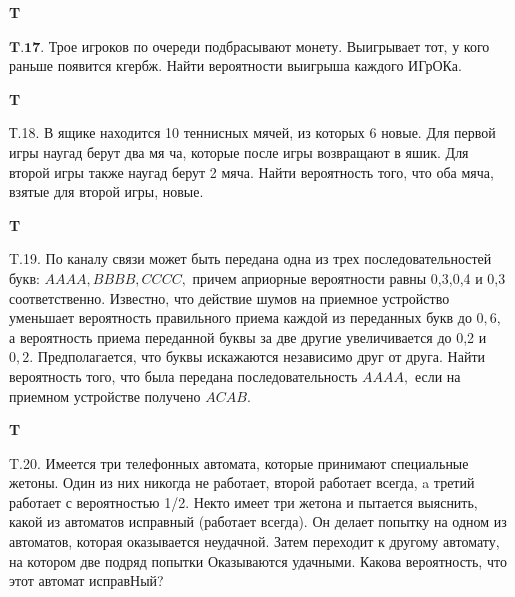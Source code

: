 \documentclass[a4paper,12pt]{article} %
\begin{document}
\begin{example}\textbf{T}

$\mathbf{T . 1 7 .}$ Трое игроков по очереди подбрасывают монету. Выигрывает тот, у кого раньше появится кгербж. Найти вероятности выигрыша каждого
ИГрОКа.



\end{example}


\begin{example}\textbf{T}

Т.18. В ящике находится 10 теннисных мячей, из которых 6 новые. Для первой игры наугад берут два мя ча, которые после игры возвращают в яшик. Для второй игры также наугад берут 2 мяча. Найти вероятность
того, что оба мяча, взятые для второй игры, новые.



\end{example}




\begin{example}\textbf{T}

T.19. По каналу связи может быть передана одна из трех последовательностей букв: $A A A A, B B B B, C C C C,$ причем априорные вероятности равны 0,3,0,4 и 0,3 соответственно. Известно, что действие шумов на приемное устройство уменьшает вероятность правильного приема каждой из переданных букв до $0,6,$ а вероятность приема переданной буквы за две другие увеличивается до 0,2 и $0,2 .$ Предполагается, что буквы искажаются независимо друг от друга. Найти вероятность того, что была передана последовательность $A A A A,$ если на приемном устройстве получено $A C A B$.



\end{example}


\begin{example}\textbf{T}

T.20. Имеется три телефонных автомата, которые принимают специальные жетоны. Один из них никогда не работает, второй работает всегда, a третий работает с вероятностью 1/2. Некто имеет три жетона и пытается выяснить, какой из автоматов исправный (работает всегда). Он
делает попытку на одном из автоматов, которая оказывается неудачной.
Затем переходит к другому автомату, на котором две подряд попытки
Оказываются удачными. Какова вероятность, что этот автомат исправНый?


\end{example}
\end{document}

